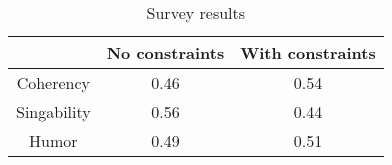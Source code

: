 \begin{table}[]
\centering
\begin{tabular}{|c|c|c|}
\hline
 & No constraints & With constraints \\
\hline
Coherency & 0.46 & 0.54 \\
Singability & 0.56 & 0.44 \\
Humor & 0.49 & 0.51 \\
\hline
\end{tabular}
\caption{Survey results}
\end{table}

